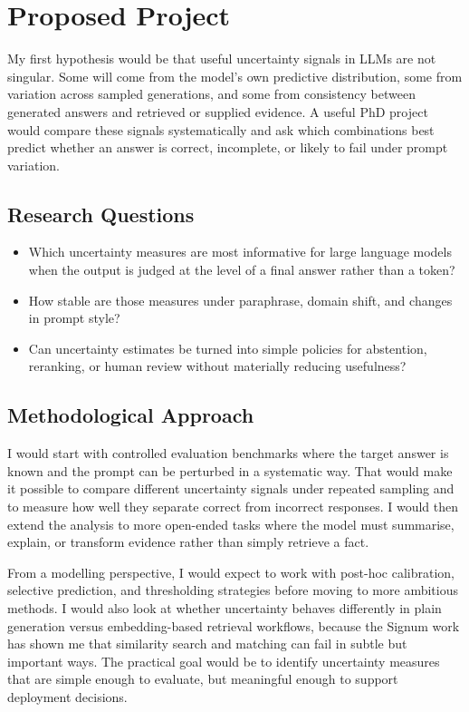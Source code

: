\documentclass[11pt,a4paper]{article}
\begin{document}
\section{Proposed Project}
My first hypothesis would be that useful uncertainty signals in LLMs are not singular. Some will come from the model's own predictive distribution, some from variation across sampled generations, and some from consistency between generated answers and retrieved or supplied evidence. A useful PhD project would compare these signals systematically and ask which combinations best predict whether an answer is correct, incomplete, or likely to fail under prompt variation.

\subsection{Research Questions}
\begin{itemize}
    \item Which uncertainty measures are most informative for large language models when the output is judged at the level of a final answer rather than a token?
    \item How stable are those measures under paraphrase, domain shift, and changes in prompt style?
    \item Can uncertainty estimates be turned into simple policies for abstention, reranking, or human review without materially reducing usefulness?
\end{itemize}

\subsection{Methodological Approach}
I would start with controlled evaluation benchmarks where the target answer is known and the prompt can be perturbed in a systematic way. That would make it possible to compare different uncertainty signals under repeated sampling and to measure how well they separate correct from incorrect responses. I would then extend the analysis to more open-ended tasks where the model must summarise, explain, or transform evidence rather than simply retrieve a fact.

From a modelling perspective, I would expect to work with post-hoc calibration, selective prediction, and thresholding strategies before moving to more ambitious methods. I would also look at whether uncertainty behaves differently in plain generation versus embedding-based retrieval workflows, because the Signum work has shown me that similarity search and matching can fail in subtle but important ways. The practical goal would be to identify uncertainty measures that are simple enough to evaluate, but meaningful enough to support deployment decisions.
\end{document}

